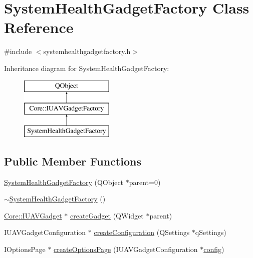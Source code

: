 \hypertarget{class_system_health_gadget_factory}{\section{System\-Health\-Gadget\-Factory Class Reference}
\label{class_system_health_gadget_factory}
}


{\ttfamily \#include $<$systemhealthgadgetfactory.\-h$>$}

Inheritance diagram for System\-Health\-Gadget\-Factory\-:\begin{figure}[H]
\begin{center}
\leavevmode
\includegraphics[height=3.000000cm]{class_system_health_gadget_factory}
\end{center}
\end{figure}
\subsection*{Public Member Functions}
\begin{DoxyCompactItemize}
\item 
\hyperlink{group___system_health_plugin_gaf19ba5915588fac5dd9f368210271115}{System\-Health\-Gadget\-Factory} (Q\-Object $\ast$parent=0)
\item 
\hyperlink{group___system_health_plugin_ga6d9272ee992e8241b7a4483dce8ff330}{$\sim$\-System\-Health\-Gadget\-Factory} ()
\item 
\hyperlink{class_core_1_1_i_u_a_v_gadget}{Core\-::\-I\-U\-A\-V\-Gadget} $\ast$ \hyperlink{group___system_health_plugin_ga042cc7fba53df83dbb7e06626f2b1006}{create\-Gadget} (Q\-Widget $\ast$parent)
\item 
I\-U\-A\-V\-Gadget\-Configuration $\ast$ \hyperlink{group___system_health_plugin_ga569580fcea35d0f1f9433378dd734624}{create\-Configuration} (Q\-Settings $\ast$q\-Settings)
\item 
I\-Options\-Page $\ast$ \hyperlink{group___system_health_plugin_gaae1b2e7613b4024f309fd5480fcbe028}{create\-Options\-Page} (I\-U\-A\-V\-Gadget\-Configuration $\ast$\hyperlink{deflate_8c_a4473b5227787415097004fd39f55185e}{config})
\end{DoxyCompactItemize}
